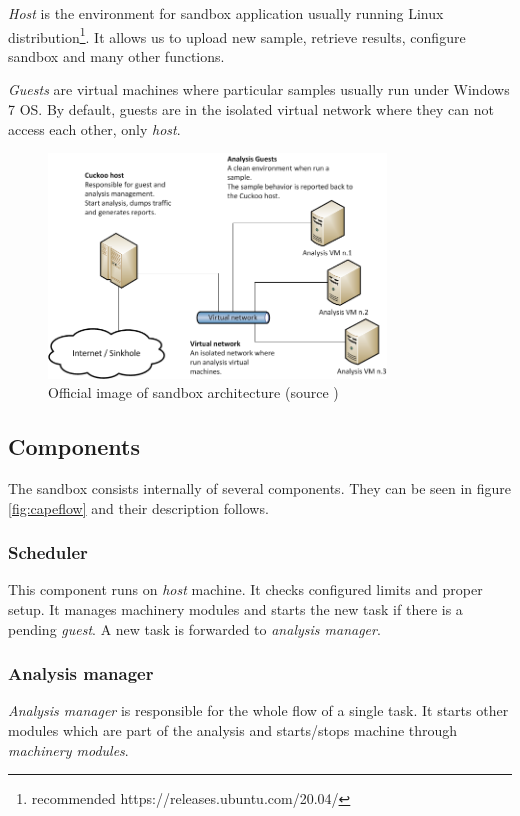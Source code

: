 \emph{Host} is the environment for sandbox application usually running Linux distribution\footnote{recommended https://releases.ubuntu.com/20.04/}. It allows us to upload new sample, retrieve results, configure sandbox and many other functions.

\emph{Guests} are virtual machines where particular samples usually run under Windows 7 OS. By default, guests are in the isolated virtual network where they can not access each other, only \emph{host}.

\begin{figure}[h]
  \centering
  \includegraphics[width=0.8\textwidth]{figures/architecture.png}
  \caption{Official image of sandbox architecture (source \cite{CAPESand75:online})}
  \label{fig:capearchitecture}
\end{figure}


\subsection{Components}
The sandbox consists internally of several components. They can be seen in figure \ref{fig:capeflow} and their description follows.

\subsubsection*{Scheduler}
This component runs on \emph{host} machine. It checks configured limits and proper setup. It manages machinery modules and starts the new task if there is a pending \emph{guest}. A new task is forwarded to \emph{analysis manager}.

\subsubsection*{Analysis manager}
\emph{Analysis manager} is responsible for the whole flow of a single task. It starts other modules which are part of the analysis and starts/stops machine through \emph{machinery modules}.

